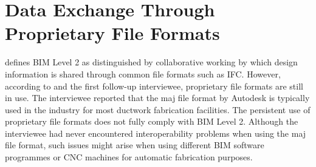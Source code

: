 





\section{Data Exchange Through Proprietary File Formats}

\cite{NBS2014} defines BIM Level 2 as distinguished by collaborative working by which design information is shared through common file formats such as IFC.
However, according to \cite{Laakso2012} and the first follow-up interviewee, proprietary file formats are still in use.
The interviewee reported that the maj file format by Autodesk is typically used in the industry for most ductwork fabrication facilities.
The persistent use of proprietary file formats does not fully comply with BIM Level 2.
Although the interviewee had never encountered interoperability problems when using the maj file format, such issues might arise when using different BIM software programmes or CNC machines for automatic fabrication purposes.

